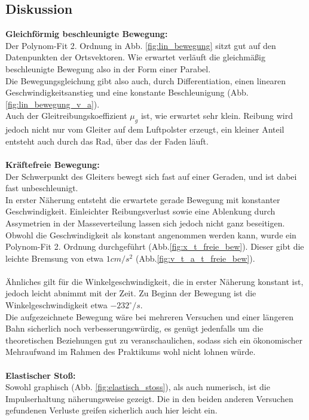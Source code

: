 \documentclass[12pt,a4paper]{article}
\begin{document}
\begin{multicols}{2}
\subsection{Diskussion}
\textbf{Gleichförmig beschleunigte Bewegung:}\\
Der Polynom-Fit 2. Ordnung in Abb. \ref{fig:lin_bewegung} sitzt gut auf den Datenpunkten der Ortsvektoren. Wie erwartet verläuft die gleichmäßig beschleunigte Bewegung also in der Form einer Parabel.\\
Die Bewegungsgleichung gibt also auch, durch Differentiation, einen linearen Geschwindigkeitsanstieg und eine konstante Beschleunigung (Abb. \ref{fig:lin_bewegung_v_a}).\\
Auch der Gleitreibungskoeffizient $\mu_g$ ist, wie erwartet sehr klein. Reibung wird jedoch nicht nur vom Gleiter auf dem Luftpolster erzeugt, ein kleiner Anteil entsteht auch durch das Rad, über das der Faden läuft.\\
\\
\textbf{Kräftefreie Bewegung:}\\
Der Schwerpunkt des Gleiters bewegt sich fast auf einer Geraden, und ist dabei fast unbeschleunigt.\\
In erster Näherung entsteht die erwartete gerade Bewegung mit konstanter Geschwindigkeit. Einleichter Reibungsverlust sowie eine Ablenkung durch Assymetrien in der Masseverteilung lassen sich jedoch nicht ganz beseitigen.\\
Obwohl die Geschwindigkeit als konstant angenommen werden kann, wurde ein Polynom-Fit 2. Ordnung durchgeführt (Abb.\ref{fig:x_t_freie_bew}). Dieser gibt die leichte Bremsung von etwa $1cm/s^2$ (Abb.\ref{fig:v_t_a_t_freie_bew}).\\
\\
Ähnliches gilt für die Winkelgeschwindigkeit, die in erster Näherung konstant ist, jedoch leicht abnimmt mit der Zeit. Zu Beginn der Bewegung ist die Winkelgeschwindigkeit etwa $-232^\circ/s$.\\
Die aufgezeichnete Bewegung wäre bei mehreren Versuchen und einer längeren Bahn sicherlich noch verbesserungswürdig, es genügt jedenfalls um die theoretischen Beziehungen gut zu veranschaulichen, sodass sich ein ökonomischer Mehraufwand im Rahmen des Praktikums wohl nicht lohnen würde.\\
\\
\textbf{Elastischer Stoß:}\\
Sowohl graphisch (Abb. \ref{fig:elastisch_stoss}), als auch numerisch, ist die Impulserhaltung näherungsweise gezeigt. Die in den beiden anderen Versuchen gefundenen Verluste greifen sicherlich auch hier leicht ein.\\

\end{multicols}
\end{document}
